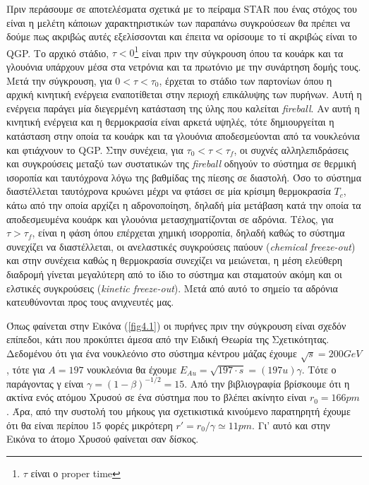 	Πριν περάσουμε σε αποτελέσματα σχετικά με το πείραμα STAR που ένας στόχος του είναι η μελέτη κάποιων χαρακτηριστικών των παραπάνω συγκρούσεων θα πρέπει να δούμε 
πως ακριβώς αυτές εξελίσσονται και έπειτα να ορίσουμε το τί ακριβώς είναι το QGP. 		
	Το αρχικό στάδιο, $\tau<0$\footnote{$\tau$ είναι ο proper time} είναι πριν την σύγκρουση	 όπου τα κουάρκ και τα γλουόνια υπάρχουν μέσα στα νετρόνια και τα πρωτόνιο με την συνάρτηση δομής τους.
	Μετά την σύγκρουση, για $0<\tau<\tau_0$, έρχεται το στάδιο των παρτονίων όπου η αρχική κινητική ενέργεια εναποτίθεται στην περιοχή επικάλυψης των πυρήνων. Αυτή η ενέργεια παράγει μία διεγερμένη κατάσταση της ύλης που καλείται \textit{fireball}. Αν αυτή η κινητική ενέργεια και η θερμοκρασία είναι αρκετά υψηλές, τότε δημιουργείται η κατάσταση στην οποία τα κουάρκ και τα γλουόνια αποδεσμεύονται από τα νουκλεόνια και φτιάχνουν το QGP.
	Στην συνέχεια, για $\tau_0<\tau<\tau_f$, οι συχνές αλληλεπιδράσεις και συγκρούσεις μεταξύ των συστατικών της \textit{fireball} οδηγούν το σύστημα σε θερμική ισοροπία και ταυτόχρονα λόγω της βαθμίδας της πίεσης σε διαστολή.
	Όσο το σύστημα διαστέλλεται ταυτόχρονα κρυώνει μέχρι να φτάσει σε μία κρίσιμη θερμοκρασία $T_c$, κάτω από την οποία αρχίζει η αδρονοποίηση, δηλαδή μία μετάβαση κατά την οποία τα αποδεσμευμένα κουάρκ και γλουόνια μετασχηματίζονται σε αδρόνια.
	Τέλος, για $\tau>\tau_f$, είναι η φάση όπου επέρχεται χημική ισορροπία, δηλαδή καθώς το σύστημα συνεχίζει να διαστέλλεται, οι ανελαστικές συγκρούσεις παύουν (\textit{chemical freeze-out}) και στην συνέχεια καθώς η θερμοκρασία συνεχίζει να μειώνεται, η μέση ελεύθερη διαδρομή γίνεται μεγαλύτερη από το ίδιο το σύστημα και σταματούν ακόμη και οι ελστικές συγκρούσεις (\textit{kinetic freeze-out}). 
	Μετά από αυτό το σημείο τα αδρόνια κατευθύνονται προς τους ανιχνευτές μας.
	
	Όπως φαίνεται στην Εικόνα (\ref{fig4.1}) οι πυρήνες πριν την σύγκρουση είναι σχεδόν επίπεδοι, κάτι που προκύπτει άμεσα από την Ειδική Θεωρία της Σχετικότητας.
	Δεδομένου ότι για ένα νουκλεόνιο στο σύστημα κέντρου μάζας έχουμε $\sqrt{s}=200GeV$, τότε για $Α=197$ νουκλεόνια θα έχουμε $E_{Au}=\sqrt{197\cdot s} = (197u) \gamma$. Tότε ο παράγοντας γ είναι  $\gamma=\left(1-\beta\right)^{-1/2}=15$. Από την βιβλιογραφία βρίσκουμε ότι η ακτίνα ενός ατόμου Χρυσού σε ένα σύστημα που το βλέπει ακίνητο είναι $r_0=166pm$. Άρα, από την συστολή του μήκους για σχετικιστικά κινούμενο παρατηρητή έχουμε ότι θα είναι περίπου 15 φορές μικρότερη $r'=r_0/\gamma\simeq 11pm$. Γι' αυτό και στην Εικόνα το άτομο Χρυσού φαίνεται σαν δίσκος.
	
